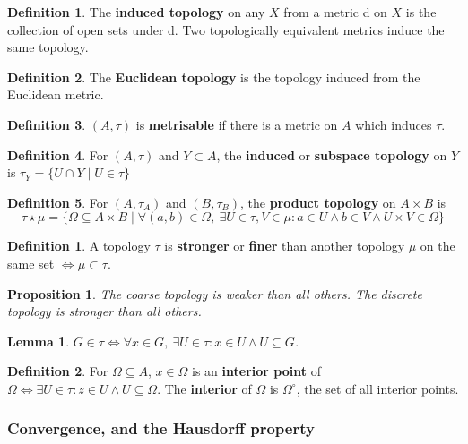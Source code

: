 \documentclass[12pt]{article}
\newtheorem{lem}[thm]{Lemma}
\newtheorem*{prop*}{Proposition}
\theoremstyle{definition}
\newtheorem{defn}{Definition}[section]
\newtheorem*{defn*}{Definition}
\begin{document}
\begin{defn*}
	The \textbf{induced topology} on any $X$ from a metric d on $X$ is the collection of open sets under d.
	Two topologically equivalent metrics induce the same topology.
\end{defn*}

\begin{defn*}
	The \textbf{Euclidean topology} is the topology induced from the Euclidean metric.
\end{defn*}

\begin{defn*}
	$(A, \tau)$ is \textbf{metrisable} if there is a metric on $A$ which induces $\tau$.
\end{defn*}

\begin{defn*}
	For $(A, \tau)$ and $Y \subset A$, the \textbf{induced} or \textbf{subspace topology} on $Y$ is $\tau_Y = \{U \cap Y \mid U \in \tau\}$
\end{defn*}

\begin{defn*}
	For $(A, \tau_A)$ and $(B, \tau_B)$, the \textbf{product topology} on $A \times B$ is
	$$\tau \star \mu = \{\Omega \subseteq A \times B \mid \forall (a, b) \in \Omega,\ \exists U \in \tau, V \in \mu : a \in U \land b \in V \land U \times V \in \Omega\}$$
\end{defn*}

\begin{defn}
	A topology $\tau$ is \textbf{stronger} or \textbf{finer} than another topology $\mu$ on the same set $\iff \mu \subset \tau$.
\end{defn}

\begin{prop*}
	The coarse topology is weaker than all others.
	The discrete topology is stronger than all others.
\end{prop*}

\begin{lem}
	$G \in \tau \iff \forall x \in G,\ \exists U \in \tau : x \in U \land U \subseteq G$.
\end{lem}

\begin{defn}
	For $\Omega \subseteq A$, $x \in \Omega$ is an \textbf{interior point} of $\Omega \iff \exists U \in \tau : z \in U \land U \subseteq \Omega$.
	The \textbf{interior} of $\Omega$ is $\Omega^{\circ}$, the set of all interior points.
\end{defn}

\subsubsection{Convergence, and the Hausdorff property}
\end{document}
